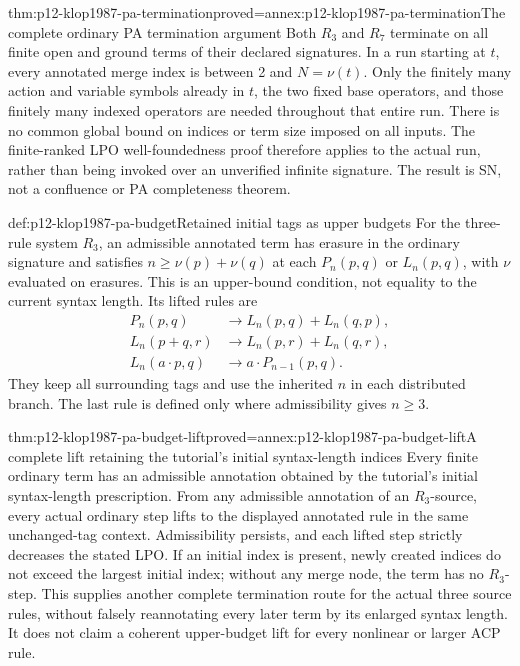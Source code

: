 \begin{hbtheorem}{thm:p12-klop1987-pa-termination}{proved=annex:p12-klop1987-pa-termination}{The complete ordinary PA termination argument}
Both \(R_3\) and \(R_7\) terminate on all finite open and ground
terms of their declared signatures. In a run starting at \(t\),
every annotated merge index is between 2 and \(N=\nu(t)\).
Only the finitely many action and variable symbols already in \(t\),
the two fixed base operators, and those finitely many indexed operators
are needed throughout that entire run. There is no common global
bound on indices or term size imposed on all inputs.
The finite-ranked LPO well-foundedness proof therefore applies to
the actual run, rather than being invoked over an unverified infinite
signature. The result is SN, not a confluence or PA completeness theorem.
\end{hbtheorem}

\begin{hbdefinition}{def:p12-klop1987-pa-budget}{Retained initial tags as upper budgets}
For the three-rule system \(R_3\), an admissible annotated term
has erasure in the ordinary signature and satisfies
\(n\geq\nu(p)+\nu(q)\) at each \(P_n(p,q)\) or
\(L_n(p,q)\), with \(\nu\) evaluated on erasures.
This is an upper-bound condition, not equality to the current
syntax length. Its lifted rules are
\begin{align*}
 P_n(p,q)&\to L_n(p,q)+L_n(q,p),\\
 L_n(p+q,r)&\to L_n(p,r)+L_n(q,r),\\
 L_n(a\cdot p,q)&\to a\cdot P_{n-1}(p,q).
\end{align*}
They keep all surrounding tags and use the inherited \(n\) in
each distributed branch. The last rule is defined only where
admissibility gives \(n\geq3\).
\end{hbdefinition}

\begin{hbtheorem}{thm:p12-klop1987-pa-budget-lift}{proved=annex:p12-klop1987-pa-budget-lift}{A complete lift retaining the tutorial's initial syntax-length indices}
Every finite ordinary term has an admissible annotation obtained by
the tutorial's initial syntax-length prescription. From any admissible
annotation of an \(R_3\)-source, every actual ordinary step lifts
to the displayed annotated rule in the same unchanged-tag context.
Admissibility persists, and each lifted step strictly decreases the
stated LPO. If an initial index is present, newly created indices
do not exceed the largest initial index; without any merge node,
the term has no \(R_3\)-step. This supplies another complete termination route for the
actual three source rules, without falsely reannotating every later
term by its enlarged syntax length. It does not claim a coherent
upper-budget lift for every nonlinear or larger ACP rule.
\end{hbtheorem}

